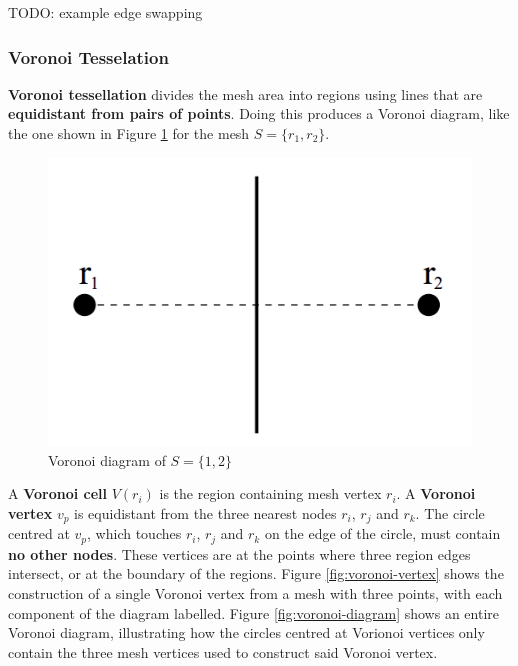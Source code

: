 \documentclass{article}
\begin{document}
TODO: example edge swapping

\subsubsection{Voronoi Tesselation}

\textbf{Voronoi tessellation} divides the mesh area into regions using lines that are \textbf{equidistant from pairs of points}. Doing this produces a Voronoi diagram, like the one shown in Figure \ref{fig:voronoi-tesselation} for the mesh $S = \lbrace r_1, r_2 \rbrace$.

\begin{figure}
	\centering
	\includegraphics[scale=0.35]{figures/voronoi-basic-diagram.png}
	\caption{Voronoi diagram of $S = \lbrace 1, 2 \rbrace$}
	\label{fig:voronoi-tesselation}
\end{figure}

A \textbf{Voronoi cell} $V(r_i)$ is the region containing mesh vertex $r_i$. A \textbf{Voronoi vertex} $v_p$ is equidistant from the three nearest nodes $r_i$, $r_j$ and $r_k$. The circle centred at $v_p$, which touches $r_i$, $r_j$ and $r_k$ on the edge of the circle, must contain \textbf{no other nodes}. These vertices are at the points where three region edges intersect, or at the boundary of the regions. Figure \ref{fig:voronoi-vertex} shows the construction of a single Voronoi vertex from a mesh with three points, with each component of the diagram labelled. Figure \ref{fig:voronoi-diagram} shows an entire Voronoi diagram, illustrating how the circles centred at Vorionoi vertices only contain the three mesh vertices used to construct said Voronoi vertex.
\end{document}
